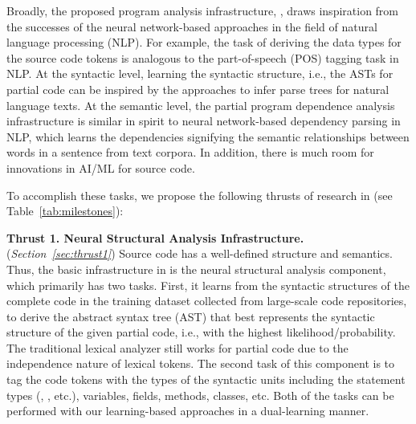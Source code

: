 Broadly, the proposed program analysis infrastructure, \tool, draws inspiration from the successes of the neural network-based approaches in the field of natural language processing (NLP). For example, the task of deriving the data types for the source code tokens is analogous to the part-of-speech (POS) tagging task in NLP. At the syntactic level, learning the syntactic structure, i.e., the ASTs for partial code can be inspired by the approaches to infer parse trees for natural language texts. At the semantic level, the partial program dependence analysis infrastructure is similar in spirit to neural network-based dependency parsing in NLP, which learns the dependencies signifying the semantic relationships between words in a sentence from text corpora. In addition, there is much room for innovations in AI/ML for source code.


To accomplish these tasks, we propose the following thrusts of research in {\tool} (see Table~\ref{tab:milestones}):

\vspace{3pt}

\noindent \textbf{Thrust 1. Neural Structural Analysis Infrastructure.} ({\em Section~\ref{sec:thrust1}}) Source code has a well-defined structure and semantics. Thus, the basic infrastructure in {\tool} is the neural structural analysis component, which primarily has two tasks. First, it learns from the syntactic structures of the complete code in the training dataset collected from large-scale code repositories, to derive the abstract syntax tree (AST) that best represents the syntactic structure of the given partial code, i.e., with the highest likelihood/probability. The traditional lexical analyzer still works for partial code due to the independence nature of lexical tokens. The second task of this component is to tag the code tokens with the types of the syntactic units including the statement types (, , etc.), variables, fields, methods, classes, etc. Both of the tasks can be performed with our learning-based approaches in a dual-learning manner.
  
